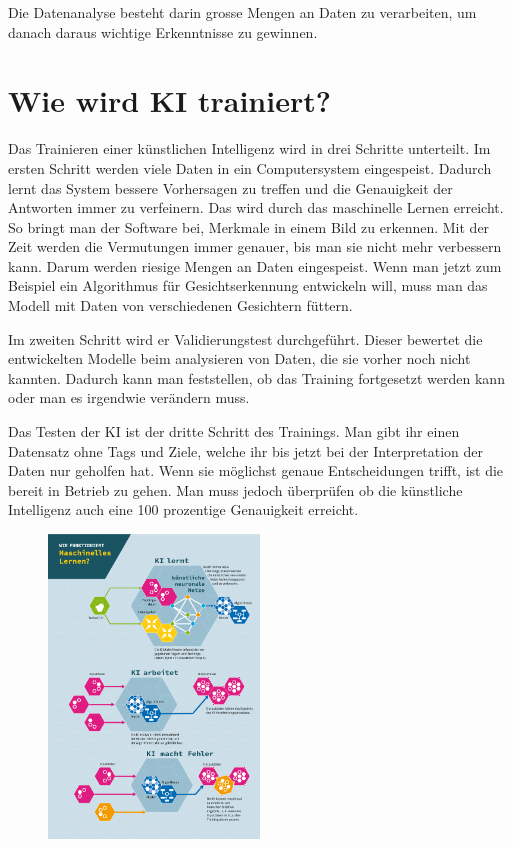 \documentclass{report}
\begin{document}
\vspace{2mm}Die Datenanalyse besteht darin grosse Mengen an Daten zu verarbeiten, um danach daraus wichtige Erkenntnisse zu gewinnen.

\section{Wie wird KI trainiert?}

Das Trainieren einer künstlichen Intelligenz wird in drei Schritte unterteilt. Im ersten Schritt werden viele Daten in ein Computersystem eingespeist. Dadurch lernt das System bessere Vorhersagen zu treffen und die Genauigkeit der Antworten immer zu verfeinern. Das wird durch das maschinelle Lernen erreicht. So bringt man der Software bei, Merkmale in einem Bild zu erkennen. Mit der Zeit werden die Vermutungen immer genauer, bis man sie nicht mehr verbessern kann. Darum werden riesige Mengen an Daten eingespeist. Wenn man jetzt zum Beispiel ein Algorithmus für Gesichtserkennung entwickeln will, muss man das Modell mit Daten von verschiedenen Gesichtern füttern. 

\vspace{2mm}Im zweiten Schritt wird er Validierungstest durchgeführt. Dieser bewertet die entwickelten Modelle beim analysieren von Daten, die sie vorher noch nicht kannten. Dadurch kann man feststellen, ob das Training fortgesetzt werden kann oder man es irgendwie verändern muss. 

\vspace{2mm}Das Testen der KI ist der dritte Schritt des Trainings. Man gibt ihr einen Datensatz ohne Tags und Ziele, welche ihr bis jetzt bei der Interpretation der Daten nur geholfen hat. Wenn sie möglichst genaue Entscheidungen trifft, ist die bereit in Betrieb zu gehen. Man muss jedoch überprüfen ob die künstliche Intelligenz auch eine 100 prozentige Genauigkeit erreicht.

\begin{figure}[h]
    \centering
    \includegraphics[width=0.5\textwidth]{training.png}
    \end{figure}
\end{document}
